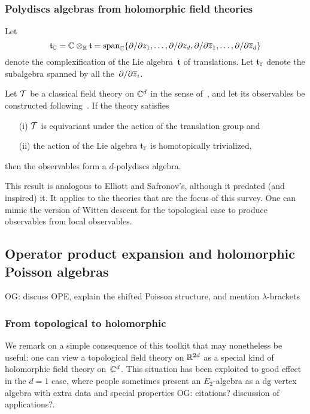 \documentclass[11pt]{amsart}
\def\owen#1{{\textcolor{violet!50!black}{OG: {#1}}}}
\begin{document}
\subsubsection{Polydiscs algebras from holomorphic field theories}

Let 
\[
\mathfrak t_\mathbb C = \mathbb C \otimes_\mathbb R \mathfrak t = \text{span}_{\mathbb C}\{\partial/\partial z_1, \ldots, \partial/\partial z_d, \partial/\partial {\overline{z}}_1, \ldots, \partial/\partial {\overline{z}}_d  \}
\]
denote the complexification of the Lie algebra~$\mathfrak t$ of translations.
Let $\mathfrak t_{{\overline{z}}}$ denote the subalgebra spanned by all the~$\partial/\partial {\overline{z}}_i$.

\begin{thm}[\cite{CG1},\owen{precise location}]
Let $\mathcal T$ be a classical field theory on $\mathbb C^d$ in the sense of~\cite{CosBook},
and let its observables be constructed following~\cite{CG2}.
If the theory satisfies 
\begin{enumerate}
\item[(i)] $\mathcal T$ is equivariant under the action of the translation group and
\item[(ii)] the action of the Lie algebra $\mathfrak t_{{\overline{z}}}$ is homotopically trivialized,
\end{enumerate}
then the observables form a $d$-polydiscs algebra.
\end{thm}

This result is analogous to Elliott and Safronov's, although it predated (and inspired) it.
It applies to the theories that are the focus of this survey.
One can mimic the version of Witten descent for the topological case to produce observables from local observables.

\subsection{Operator product expansion and holomorphic Poisson algebras}

\owen{discuss OPE, explain the shifted Poisson structure, and mention $\lambda$-brackets}

\subsubsection{From topological to holomorphic}

We remark on a simple consequence of this toolkit that may nonetheless be useful:
one can view a topological field theory on $\mathbb R^{2d}$ as a special kind of holomorphic field theory on~$\mathbb C^{d}$.
This situation has been exploited to good effect in the $d=1$ case,
where people sometimes present an $E_2$-algebra as a dg vertex algebra with extra data and special properties \owen{citations? discussion of applications?}.
\end{document}
